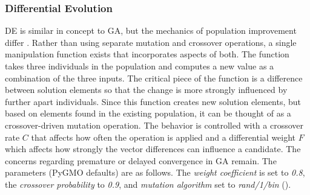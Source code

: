 \documentclass{tamuccthesis}
\begin{document}
\subsubsection{Differential Evolution }

DE is similar in concept to GA, but the mechanics of population improvement differ \cite{de:zhang:2013}. Rather than using separate mutation and crossover operations, a single manipulation function exists that incorporates aspects of both. The function takes three individuals in the population and computes a new value as a combination of the three inputs. The critical piece of the function is a difference between solution elements so that the change is more strongly influenced by further apart individuals. Since this function creates new solution elements, but based on elements found in the existing population, it can be thought of as a crossover-driven mutation operation. The behavior is controlled with a crossover rate $C$ that affects how often the operation is applied and a differential weight $F$ which affects how strongly the vector differences can influence a candidate. The concerns regarding premature or delayed convergence in GA remain. The parameters (PyGMO defaults) are as follows. The \textit{weight coefficient} is set to \textit{0.8}, the \textit{crossover probability} to \textit{0.9}, and \textit{mutation algorithm} set to \textit{rand/1/bin} (\cite{de:neri:2010}). 
\end{document}
